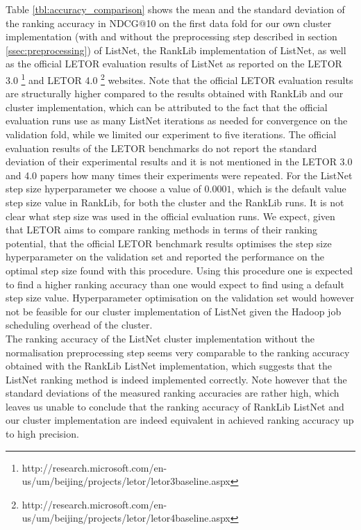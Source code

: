 Table \ref{tbl:accuracy_comparison} shows the mean and the standard deviation of the ranking accuracy in \ac{NDCG}@10 on the first data fold for our own cluster implementation (with and without the preprocessing step described in section \ref{ssec:preprocessing}) of ListNet, the RankLib implementation of ListNet, as well as the official LETOR evaluation results of ListNet as reported on the LETOR 3.0 \footnote{http://research.microsoft.com/en-us/um/beijing/projects/letor/letor3baseline.aspx} and LETOR 4.0 \footnote{http://research.microsoft.com/en-us/um/beijing/projects/letor/letor4baseline.aspx} websites. Note that the official LETOR evaluation results are structurally higher compared to the results obtained with RankLib and our cluster implementation, which can be attributed to the fact that the official evaluation runs use as many ListNet iterations as needed for convergence on the validation fold, while we limited our experiment to five iterations. The official evaluation results of the LETOR benchmarks do not report the standard deviation of their experimental results and it is not mentioned in the LETOR 3.0 and 4.0 papers \cite{Qin2010, Qin2013} how many times their experiments were repeated. For the ListNet step size hyperparameter we choose a value of $0.0001$, which is the default value step size value in RankLib, for both the cluster and the RankLib runs. It is not clear what step size was used in the official evaluation runs. We expect, given that LETOR aims to compare ranking methods in terms of their ranking potential, that the official LETOR benchmark results optimises the step size hyperparameter on the validation set and reported the performance on the optimal step size found with this procedure. Using this procedure one is expected to find a higher ranking accuracy than one would expect to find using a default step size value. Hyperparameter optimisation on the validation set would however not be feasible for our cluster implementation of ListNet given the Hadoop job scheduling overhead of the cluster.\\

The ranking accuracy of the ListNet cluster implementation without the normalisation preprocessing step seems very comparable to the ranking accuracy obtained with the RankLib ListNet implementation, which suggests that the ListNet ranking method is indeed implemented correctly. Note however that the standard deviations of the measured ranking accuracies are rather high, which leaves us unable to conclude that the ranking accuracy of RankLib ListNet and our cluster implementation are indeed equivalent in achieved ranking accuracy up to high precision.\\

